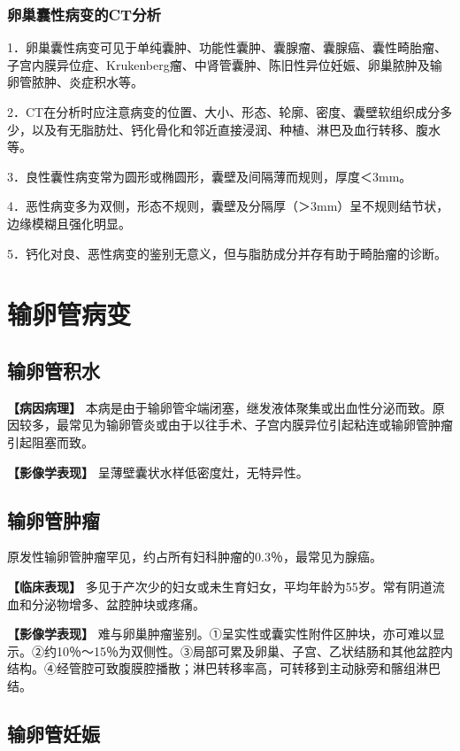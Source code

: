 \subsubsection{卵巢囊性病变的CT分析}

1．卵巢囊性病变可见于单纯囊肿、功能性囊肿、囊腺瘤、囊腺癌、囊性畸胎瘤、子宫内膜异位症、Krukenberg瘤、中肾管囊肿、陈旧性异位妊娠、卵巢脓肿及输卵管脓肿、炎症积水等。

2．CT在分析时应注意病变的位置、大小、形态、轮廓、密度、囊壁软组织成分多少，以及有无脂肪灶、钙化骨化和邻近直接浸润、种植、淋巴及血行转移、腹水等。

3．良性囊性病变常为圆形或椭圆形，囊壁及间隔薄而规则，厚度＜3mm。

4．恶性病变多为双侧，形态不规则，囊壁及分隔厚（＞3mm）呈不规则结节状，边缘模糊且强化明显。

5．钙化对良、恶性病变的鉴别无意义，但与脂肪成分并存有助于畸胎瘤的诊断。

\section{输卵管病变}

\subsection{输卵管积水}

\textbf{【病因病理】}
本病是由于输卵管伞端闭塞，继发液体聚集或出血性分泌而致。原因较多，最常见为输卵管炎或由于以往手术、子宫内膜异位引起粘连或输卵管肿瘤引起阻塞而致。

\textbf{【影像学表现】} 呈薄壁囊状水样低密度灶，无特异性。

\subsection{输卵管肿瘤}

原发性输卵管肿瘤罕见，约占所有妇科肿瘤的0.3％，最常见为腺癌。

\textbf{【临床表现】}
多见于产次少的妇女或未生育妇女，平均年龄为55岁。常有阴道流血和分泌物增多、盆腔肿块或疼痛。

\textbf{【影像学表现】}
难与卵巢肿瘤鉴别。①呈实性或囊实性附件区肿块，亦可难以显示。②约10％～15％为双侧性。③局部可累及卵巢、子宫、乙状结肠和其他盆腔内结构。④经管腔可致腹膜腔播散；淋巴转移率高，可转移到主动脉旁和髂组淋巴结。

\subsection{输卵管妊娠}

